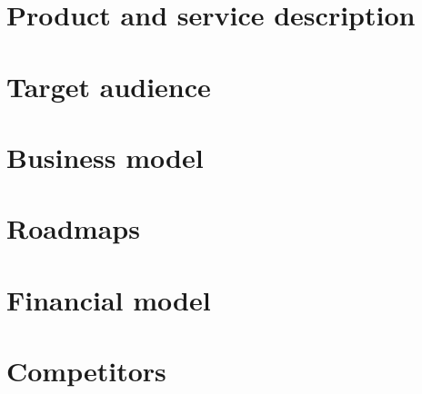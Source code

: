 \section{Product and service description}

\section{Target audience}

\section{Business model}

\section{Roadmaps}

\section{Financial model}

\section{Competitors}



